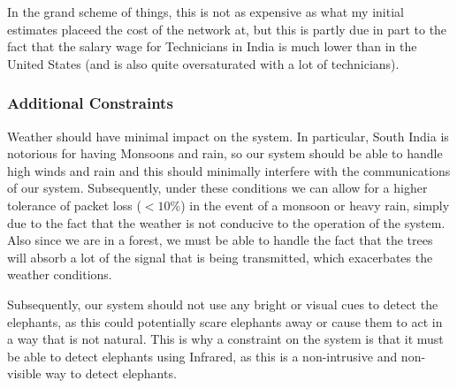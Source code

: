 In the grand scheme of things, this is not as expensive as what my initial estimates placeed the cost of the network at, but this is partly due in part to the fact that the salary wage for Technicians in India is much lower than in the United States (and is also quite oversaturated with a lot of technicians).


\subsubsection{Additional Constraints}
Weather should have minimal impact on the system. In particular, South India is notorious for having Monsoons and rain, so our system should be able to handle high winds and rain and this should minimally interfere with the communications of our system. Subsequently, under these conditions we can allow for a higher tolerance of packet loss ($< 10\%$) in the event of a monsoon or heavy rain, simply due to the fact that the weather is not conducive to the operation of the system. Also since we are in a forest, we must be able to handle the fact that the trees will absorb a lot of the signal that is being transmitted, which exacerbates the weather conditions.

Subsequently, our system should not use any bright or visual cues to detect the elephants, as this could potentially scare elephants away or cause them to act in a way that is not natural. This is why a constraint on the system is that it must be able to detect elephants using Infrared, as this is a non-intrusive and non-visible way to detect elephants.


